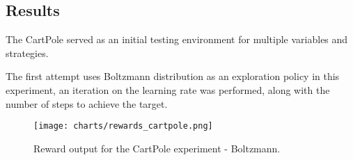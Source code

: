 \subsection*{Results}
The CartPole served as an initial testing environment for multiple variables and strategies.

The first attempt uses Boltzmann distribution as an exploration policy %
in this experiment, an iteration on the learning rate was performed, along with the number of steps to achieve the target.

\begin{figure}[H]
 \centering
 \texttt{[image: charts/rewards\_cartpole.png]}
 \caption{Reward output for the CartPole experiment - Boltzmann. }
 \end{figure}


